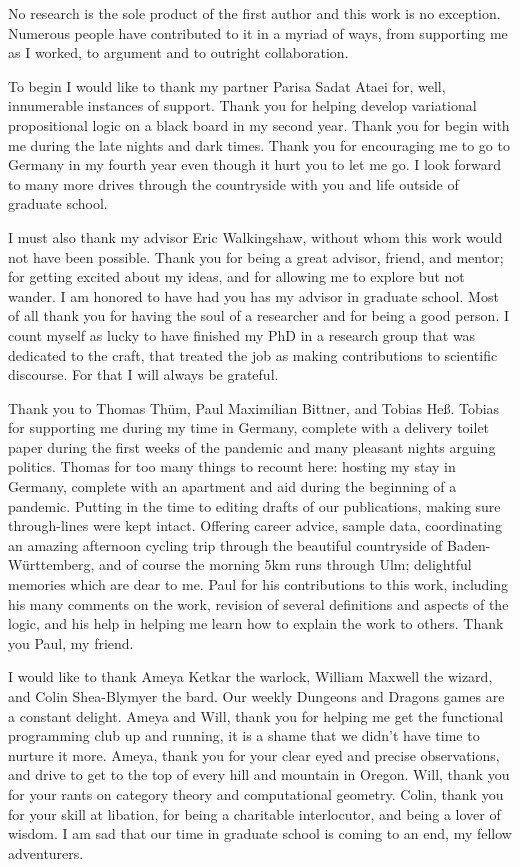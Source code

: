 No research is the sole product of the first author and this work is no
exception. Numerous people have contributed to it in a myriad of ways, from
supporting me as I worked, to argument and to outright collaboration.

To begin I would like to thank my partner Parisa Sadat Ataei for, well,
innumerable instances of support. Thank you for helping develop variational
propositional logic on a black board in my second year. Thank you for begin with
me during the late nights and dark times. Thank you for encouraging me to go to
Germany in my fourth year even though it hurt you to let me go. I look forward
to many more drives through the countryside with you and life outside of
graduate school.

I must also thank my advisor Eric Walkingshaw, without whom this work would not
have been possible. Thank you for being a great advisor, friend, and mentor; for
getting excited about my ideas, and for allowing me to explore but not wander. I
am honored to have had you has my advisor in graduate school. Most of all thank
you for having the soul of a researcher and for being a good person. I count
myself as lucky to have finished my PhD in a research group that was dedicated
to the craft, that treated the job as making contributions to scientific
discourse. For that I will always be grateful.

Thank you to Thomas Thüm, Paul Maximilian Bittner, and Tobias Heß. Tobias for
supporting me during my time in Germany, complete with a delivery toilet paper
during the first weeks of the pandemic and many pleasant nights arguing
politics. Thomas for too many things to recount here: hosting my stay in
Germany, complete with an apartment and aid during the beginning of a pandemic.
Putting in the time to editing drafts of our publications, making sure
through-lines were kept intact. Offering career advice, sample data,
coordinating an amazing afternoon cycling trip through the beautiful countryside
of Baden-Württemberg, and of course the morning 5km runs through Ulm; delightful
memories which are dear to me. Paul for his contributions to this work,
including his many comments on the work, revision of several definitions and
aspects of the logic, and his help in helping me learn how to explain the work
to others. Thank you Paul, my friend.

I would like to thank Ameya Ketkar the warlock, William Maxwell the wizard, and
Colin Shea-Blymyer the bard. Our weekly Dungeons and Dragons games are a
constant delight. Ameya and Will, thank you for helping me get the functional
programming club up and running, it is a shame that we didn't have time to
nurture it more. Ameya, thank you for your clear eyed and precise observations,
and drive to get to the top of every hill and mountain in Oregon. Will, thank
you for your rants on category theory and computational geometry. Colin, thank
you for your skill at libation, for being a charitable interlocutor, and being a
lover of wisdom. I am sad that our time in graduate school is coming to an end,
my fellow adventurers.

